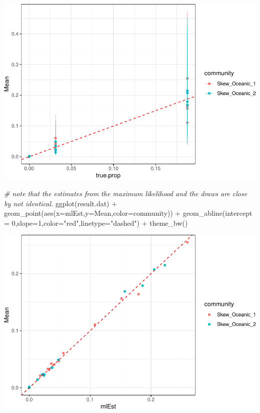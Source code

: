 \documentclass[
]{article}
\newenvironment{Shaded}{\begin{snugshade}}{\end{snugshade}}
\newcommand{\AttributeTok}[1]{\textcolor[rgb]{0.77,0.63,0.00}{#1}}
\newcommand{\CommentTok}[1]{\textcolor[rgb]{0.56,0.35,0.01}{\textit{#1}}}
\newcommand{\DecValTok}[1]{\textcolor[rgb]{0.00,0.00,0.81}{#1}}
\newcommand{\FunctionTok}[1]{\textcolor[rgb]{0.00,0.00,0.00}{#1}}
\newcommand{\NormalTok}[1]{#1}
\newcommand{\SpecialCharTok}[1]{\textcolor[rgb]{0.00,0.00,0.00}{#1}}
\newcommand{\StringTok}[1]{\textcolor[rgb]{0.31,0.60,0.02}{#1}}
\begin{document}
\includegraphics{Appendix_S4_files/figure-latex/stan_plots-3.pdf}

\begin{Shaded}
\begin{Highlighting}[]
\CommentTok{\# note that the estimates from the maximum likelihood and the draws are close by not identical.}
\FunctionTok{ggplot}\NormalTok{(result.dat) }\SpecialCharTok{+}
    \FunctionTok{geom\_point}\NormalTok{(}\FunctionTok{aes}\NormalTok{(}\AttributeTok{x=}\NormalTok{mlEst,}\AttributeTok{y=}\NormalTok{Mean,}\AttributeTok{color=}\NormalTok{community)) }\SpecialCharTok{+}
    \FunctionTok{geom\_abline}\NormalTok{(}\AttributeTok{intercept =} \DecValTok{0}\NormalTok{,}\AttributeTok{slope=}\DecValTok{1}\NormalTok{,}\AttributeTok{color=}\StringTok{"red"}\NormalTok{,}\AttributeTok{linetype=}\StringTok{"dashed"}\NormalTok{) }\SpecialCharTok{+}
    \FunctionTok{theme\_bw}\NormalTok{()}
\end{Highlighting}
\end{Shaded}

\includegraphics{Appendix_S4_files/figure-latex/stan_plots-4.pdf}
\end{document}
